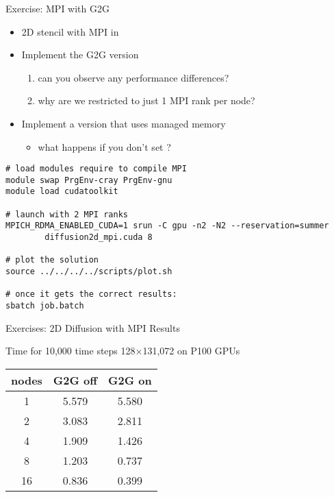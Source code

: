 \documentclass[aspectratio=43]{beamer}
\begin{document}
\begin{frame}[fragile]{Exercise: MPI with G2G}
    \begin{itemize}
        \item 2D stencil with MPI in 
        \item Implement the G2G version
        \begin{enumerate}
            \item can you observe any performance differences?
            \item why are we restricted to just 1 MPI rank per node?
        \end{enumerate}
        \item Implement a version that uses managed memory
        \begin{itemize}
            \item what happens if you don't set ?
        \end{itemize}
    \end{itemize}

    \begin{terminal}{}
        \begin{lstlisting}[style=terminal]
# load modules require to compile MPI
module swap PrgEnv-cray PrgEnv-gnu
module load cudatoolkit

# launch with 2 MPI ranks
MPICH_RDMA_ENABLED_CUDA=1 srun -C gpu -n2 -N2 --reservation=summer
        diffusion2d_mpi.cuda 8

# plot the solution
source ../../../../scripts/plot.sh

# once it gets the correct results:
sbatch job.batch
        \end{lstlisting}
   \end{terminal}

\end{frame}

\begin{frame}[fragile]{Exercises: 2D Diffusion with MPI Results}
    \begin{info}{Time for 10,000 time steps \@ 128$\times$131,072 on P100 GPUs}
       \begin{center}
           \begin{tabular}{ccc}
               \hline
               nodes   &   G2G off & G2G on \\
                \hline
               1       &  5.579    &  5.580 \\
               2       &  3.083    &  2.811 \\
               4       &  1.909    &  1.426 \\
               8       &  1.203    &  0.737 \\
              16       &  0.836    &  0.399 \\
           \end{tabular}
       \end{center}
   \end{info}
\end{frame}
\end{document}
